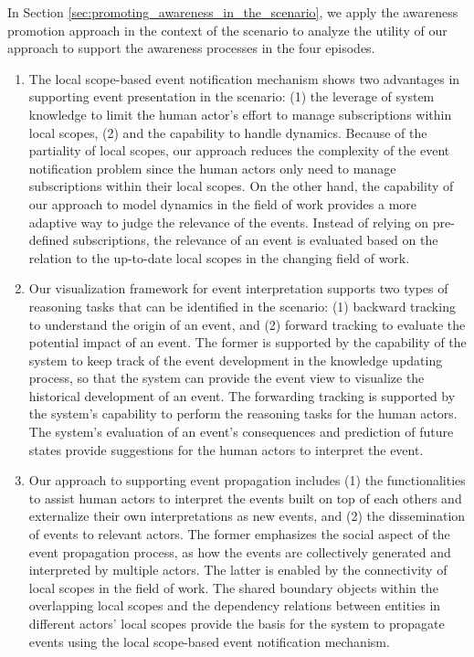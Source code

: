 In Section \ref{sec:promoting_awareness_in_the_scenario}, we apply the awareness promotion approach in the context of the scenario to analyze the utility of our approach to support the awareness processes in the four episodes. 
\begin{enumerate}
	\item The local scope-based event notification mechanism shows two advantages in supporting event presentation in the scenario: (1) the leverage of system knowledge to limit the human actor’s effort to manage subscriptions within local scopes, (2) and the capability to handle dynamics. Because of the partiality of local scopes, our approach reduces the complexity of the event notification problem since the human actors only need to manage subscriptions within their local scopes. On the other hand, the capability of our approach to model dynamics in the field of work provides a more adaptive way to judge the relevance of the events. Instead of relying on pre-defined subscriptions, the relevance of an event is evaluated based on the relation to the up-to-date local scopes in the changing field of work.
	\item Our visualization framework for event interpretation supports two types of reasoning tasks that can be identified in the scenario: (1) backward tracking to understand the origin of an event, and (2) forward tracking to evaluate the potential impact of an event. The former is supported by the capability of the system to keep track of the event development in the knowledge updating process, so that the system can provide the event view to visualize the historical development of an event. The forwarding tracking is supported by the system’s capability to perform the reasoning tasks for the human actors. The system's evaluation of an event's consequences and prediction of future states provide suggestions for the human actors to interpret the event. 
	\item Our approach to supporting event propagation includes (1) the functionalities to assist human actors to interpret the events built on top of each others and externalize their own interpretations as new events, and (2) the dissemination of events to relevant actors. The former emphasizes the social aspect of the event propagation process, as how the events are collectively generated and interpreted by multiple actors. The latter is enabled by the connectivity of local scopes in the field of work. The shared boundary objects within the overlapping local scopes and the dependency relations between entities in different actors' local scopes provide the basis for the system to propagate events using the local scope-based event notification mechanism.
\end{enumerate}





 

